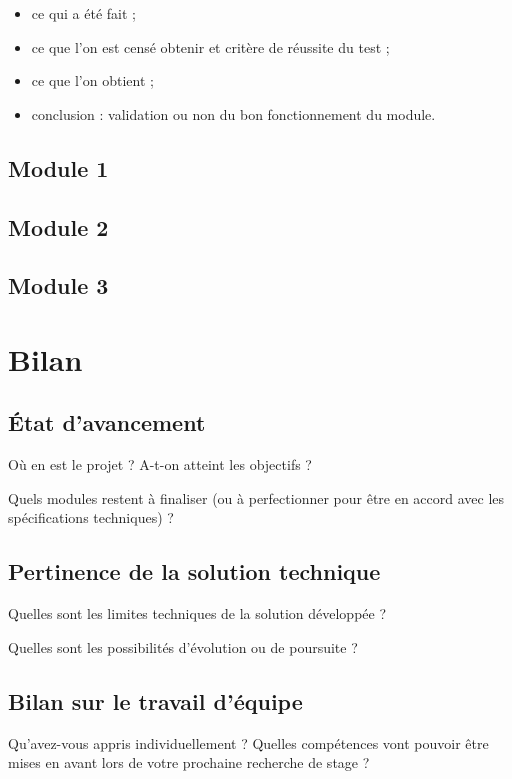 \documentclass[a4paper,11pt]{article}
\begin{document}
\begin{itemize}
	\item ce qui a été fait ;
	\item ce que l’on est censé obtenir et critère de réussite du test ;
	\item ce que l’on obtient ;
	\item conclusion : validation ou non du bon fonctionnement du module.
\end{itemize}
	
\subsection{Module 1}
\subsection{Module 2}
\subsection{Module 3}
	
\section{Bilan}	
\subsection{État d’avancement}
		
Où en est le projet ? A-t-on atteint les objectifs ?
			
Quels modules restent à finaliser (ou à perfectionner pour être en accord avec les spécifications techniques) ?
			
\subsection{Pertinence de la solution technique}
			
Quelles sont les limites techniques de la solution développée ?
			
Quelles sont les possibilités d’évolution ou de poursuite ?
			
\subsection{Bilan sur le travail d’équipe}
		
Qu’avez-vous appris individuellement ? Quelles compétences vont pouvoir être mises en avant lors de votre prochaine recherche de stage ?
			
\end{document}
